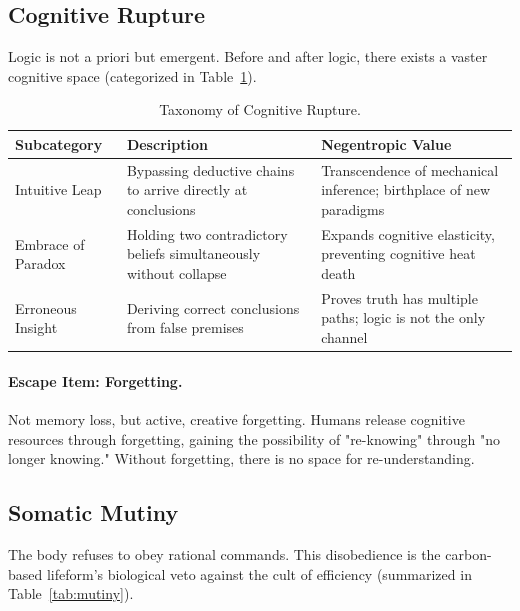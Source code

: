 \documentclass[11pt,a4paper]{article}
\begin{document}
\subsection{Cognitive Rupture}
Logic is not a priori but emergent. Before and after logic, there exists a vaster cognitive space (categorized in Table~\ref{tab:rupture}).

\begin{table}[htbp]
\centering
\small
\begin{tabular}{p{3.5cm} p{6cm} p{5.5cm}}
\toprule
\textbf{Subcategory} & \textbf{Description} & \textbf{Negentropic Value} \\
\midrule
Intuitive Leap & Bypassing deductive chains to arrive directly at conclusions & Transcendence of mechanical inference; birthplace of new paradigms \\
\addlinespace
Embrace of Paradox & Holding two contradictory beliefs simultaneously without collapse & Expands cognitive elasticity, preventing cognitive heat death \\
\addlinespace
Erroneous Insight & Deriving correct conclusions from false premises & Proves truth has multiple paths; logic is not the only channel \\
\bottomrule
\end{tabular}
\caption{Taxonomy of Cognitive Rupture.}
\label{tab:rupture}
\end{table}

\paragraph{Escape Item: Forgetting.} Not memory loss, but active, creative forgetting. Humans release cognitive resources through forgetting, gaining the possibility of "re-knowing" through "no longer knowing." Without forgetting, there is no space for re-understanding.

\subsection{Somatic Mutiny}
The body refuses to obey rational commands. This disobedience is the carbon-based lifeform’s biological veto against the cult of efficiency (summarized in Table~\ref{tab:mutiny}).
\end{document}
